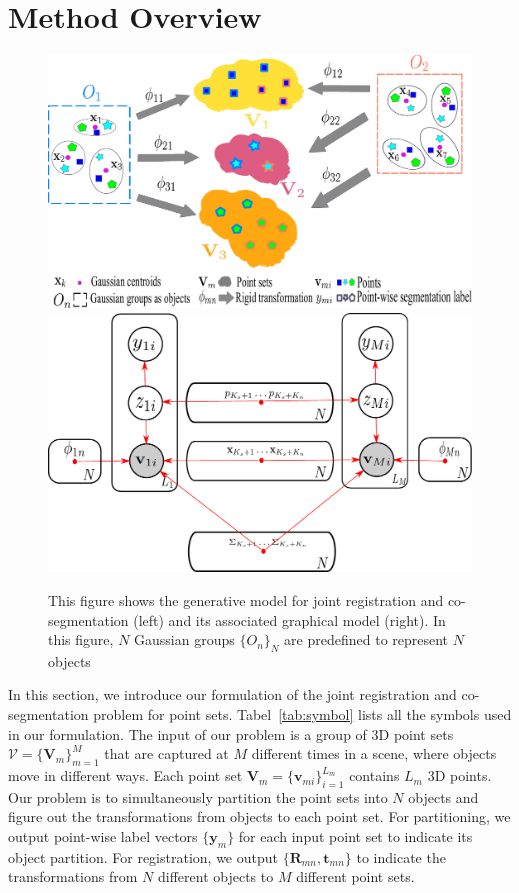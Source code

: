 \section{Method Overview}
\begin{figure}[htb]
	\centering
	\includegraphics[width=0.45\linewidth]{images/formulation}
	\hspace{0.1\linewidth}
	\includegraphics[width=0.40\linewidth]{images/formulation2}
	\caption{This figure shows the generative model for joint registration and co-segmentation (left) and its associated graphical model (right). In this figure, $N$ Gaussian groups $\{O_n\}_N$ are predefined to represent $N$ objects } 
	\label{fig:formulation}
\end{figure}
\label{sec:method}
In this section, we introduce our formulation of the joint registration and co-segmentation problem for point sets. Tabel~\ref{tab:symbol} lists all the symbols used in our formulation. The input of our problem is a group of 3D point sets  $\mathcal{V}=\{\mathbf{V}_m\}^{M}_{m=1}$ that are captured at $M$ different times in a scene, where objects move in different ways. Each point set $\mathbf{V}_m=\{\mathbf{v}_{mi}\}^{L_m}_{i=1}$ contains $L_m$ 3D points. Our problem is to simultaneously partition the point sets into $N$ objects and figure out the transformations from objects to each point set. For partitioning, we output point-wise label vectors $\{\mathbf{y}_m\}$ for each input point set to indicate its object partition. For registration, we output $\{\mathbf{R}_{mn},\mathbf{t}_{mn}\}$ to indicate the transformations from $N$ different objects to $M$ different point sets.
